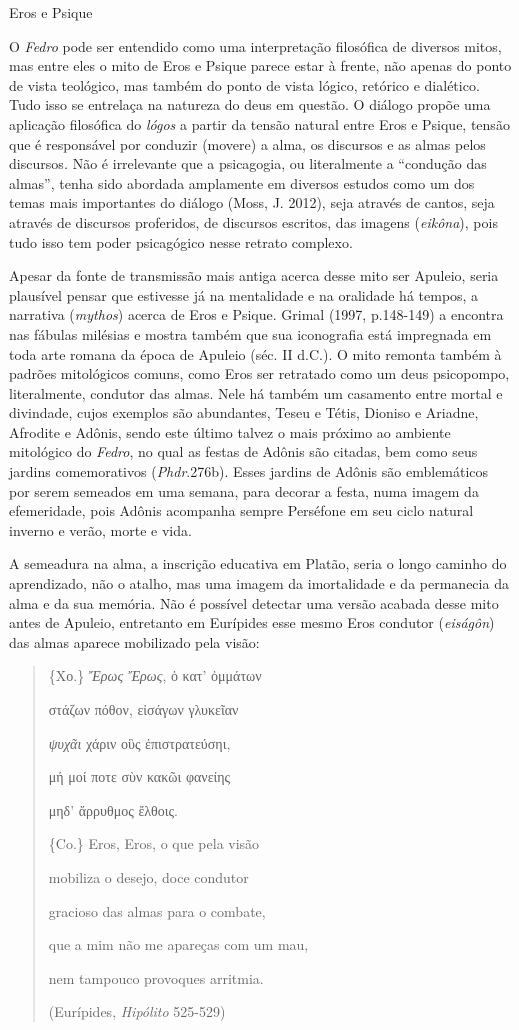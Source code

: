 Eros e Psique

O \emph{Fedro} pode ser entendido como uma interpretação filosófica de
diversos mitos, mas entre eles o mito de Eros e Psique parece estar à
frente, não apenas do ponto de vista teológico, mas também do ponto de
vista lógico, retórico e dialético. Tudo isso se entrelaça na natureza
do deus em questão. O diálogo propõe uma aplicação filosófica do
\emph{lógos} a partir da tensão natural entre Eros e Psique, tensão que
é responsável por conduzir (movere) a alma, os discursos e as almas
pelos discursos\emph{.} Não é irrelevante que a psicagogia, ou
literalmente a ``condução das almas'', tenha sido abordada amplamente em
diversos estudos como um dos temas mais importantes do diálogo (Moss, J.
2012), seja através de cantos, seja através de discursos proferidos, de
discursos escritos, das imagens (\emph{eikôna}), pois tudo isso tem
poder psicagógico nesse retrato complexo.

Apesar da fonte de transmissão mais antiga acerca desse mito ser
Apuleio, seria plausível pensar que estivesse já na mentalidade e na
oralidade há tempos, a narrativa (\emph{mythos}) acerca de Eros e
Psique. Grimal (1997, p.148-149) a encontra nas fábulas milésias e
mostra também que sua iconografia está impregnada em toda arte romana da
época de Apuleio (séc. II d.C.). O mito remonta também à padrões
mitológicos comuns, como Eros ser retratado como um deus psicopompo,
literalmente, condutor das almas. Nele há também um casamento entre
mortal e divindade, cujos exemplos são abundantes, Teseu e Tétis,
Dioniso e Ariadne, Afrodite e Adônis, sendo este último talvez o mais
próximo ao ambiente mitológico do \emph{Fedro}, no qual as festas de
Adônis são citadas, bem como seus jardins comemorativos
(\emph{Phdr}.276b). Esses jardins de Adônis são emblemáticos por serem
semeados em uma semana, para decorar a festa, numa imagem da
efemeridade, pois Adônis acompanha sempre Perséfone em seu ciclo natural
inverno e verão, morte e vida.

A semeadura na alma, a inscrição educativa em Platão, seria o longo
caminho do aprendizado, não o atalho, mas uma imagem da imortalidade e
da permanecia da alma e da sua memória. Não é possível detectar uma
versão acabada desse mito antes de Apuleio, entretanto em Eurípides esse
mesmo Eros condutor (\emph{eiságôn}) das almas aparece mobilizado pela
visão:

\begin{quote}
\{Χο.\} \emph{Ἔρως Ἔρως}, ὁ κατ' ὀμμάτων

στάζων πόθον, εἰσάγων γλυκεῖαν

\emph{ψυχᾶι} χάριν οὓς ἐπιστρατεύσηι,

μή μοί ποτε σὺν κακῶι φανείης

μηδ' ἄρρυθμος ἔλθοις.

\{Co.\} Eros, Eros, o que pela visão

mobiliza o desejo, doce condutor

gracioso das almas para o combate,

que a mim não me apareças com um mau,

nem tampouco provoques arritmia.

(Eurípides, \emph{Hipólito} 525-529)
\end{quote}

